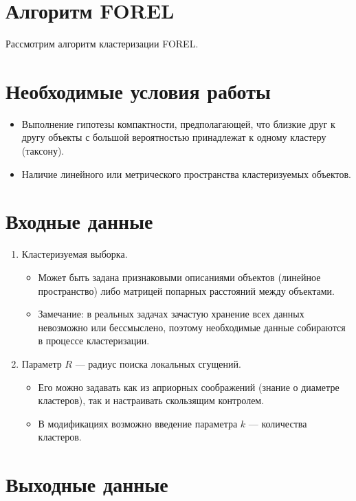 \section{Алгоритм FOREL}
Рассмотрим алгоритм кластеризации FOREL.
\section*{Необходимые условия работы}

\begin{itemize}
    \item Выполнение гипотезы компактности, предполагающей, что близкие друг к другу объекты с большой вероятностью принадлежат к одному кластеру (таксону).
    \item Наличие линейного или метрического пространства кластеризуемых объектов.
\end{itemize}

\section*{Входные данные}

\begin{enumerate}
    \item Кластеризуемая выборка.
          \begin{itemize}
              \item Может быть задана признаковыми описаниями объектов (линейное пространство) либо матрицей попарных расстояний между объектами.
              \item Замечание: в реальных задачах зачастую хранение всех данных невозможно или бессмыслено, поэтому необходимые данные собираются в процессе кластеризации.
          \end{itemize}
    \item Параметр \( R \) — радиус поиска локальных сгущений.
          \begin{itemize}
              \item Его можно задавать как из априорных соображений (знание о диаметре кластеров), так и настраивать скользящим контролем.
              \item В модификациях возможно введение параметра \( k \) — количества кластеров.
          \end{itemize}
\end{enumerate}

\section*{Выходные данные}

